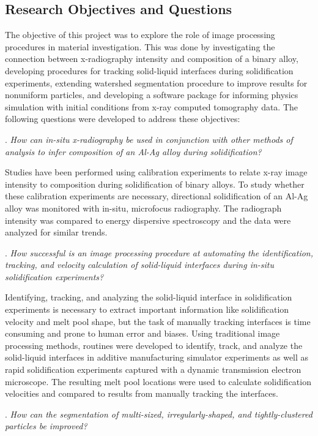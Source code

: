 \subsection{Research Objectives and Questions}
The objective of this project was to explore the role of image processing
procedures in material investigation. This was done by investigating the
connection between x-radiography intensity and composition of a binary
alloy, developing procedures for tracking solid-liquid interfaces during
solidification experiments, extending watershed segmentation procedure to
improve results for nonuniform particles, and developing a software
package for informing physics simulation with initial conditions from
x-ray computed tomography data. The following questions were developed to
address these objectives:

\bigskip
{}. \textit{
    How can in-situ x-radiography be used in conjunction with
    other methods of analysis to infer composition of an Al-Ag alloy during
    solidification?
}

Studies have been performed using calibration experiments to relate x-ray
image intensity to composition during solidification of binary alloys. To
study whether these calibration experiments are necessary, directional
solidification of an Al-Ag alloy was monitored with in-situ, microfocus
radiography. The radiograph intensity was compared to energy dispersive
spectroscopy and the data were analyzed for similar trends.

\bigskip
{}. \textit{
    How successful is an image processing procedure at automating the
    identification, tracking, and velocity calculation of solid-liquid interfaces
    during in-situ solidification experiments?
}

Identifying, tracking, and analyzing the solid-liquid
interface in solidification experiments is necessary to extract important
information like solidification velocity and melt pool shape, but the task
of manually tracking interfaces is time consuming and prone to human error
and biases. Using traditional image processing methods, routines were
developed to identify, track, and analyze the solid-liquid interfaces in
additive manufacturing simulator experiments as well as rapid
solidification experiments captured with a dynamic transmission electron
microscope. The resulting melt pool locations were used to calculate
solidification velocities and compared to results from manually tracking
the interfaces.

\bigskip
{}. \textit{
    How can the segmentation of multi-sized, irregularly-shaped, and
    tightly-clustered particles be improved?
}

